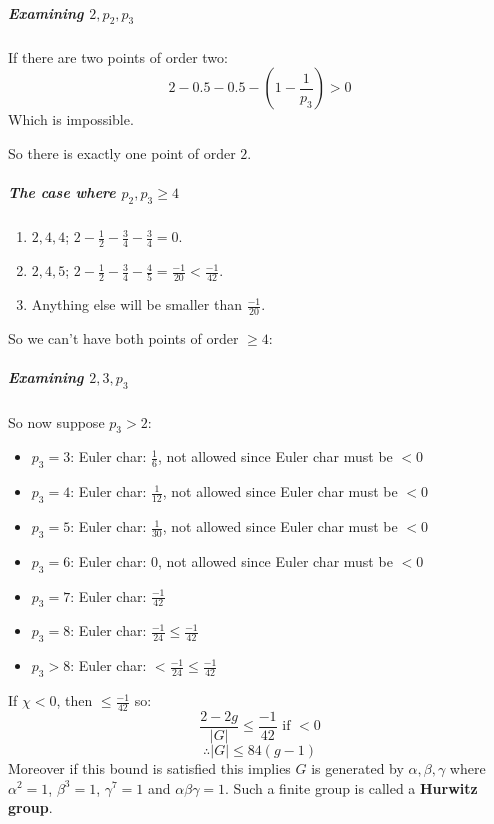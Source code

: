 \subparagraph*{Examining $2,p_2,p_3$}

If there are two points of order two:\[2-0.5-0.5-(1-\frac{1}{p_3}) > 0\]Which is impossible.

So there is exactly one point of order $2$.

\subparagraph*{The case where $p_2,p_3\geq 4$}\begin{enumerate}
    \item $2,4,4$; $2-\frac{1}{2}-\frac{3}{4}-\frac{3}{4} = 0$.
    \item $2,4,5$; $2-\frac{1}{2}-\frac{3}{4}-\frac{4}{5} = \frac{-1}{20}<\frac{-1}{42}$.
    \item Anything else will be smaller than $\frac{-1}{20}$.
\end{enumerate}

So we can't have both points of order $\geq 4$:


\subparagraph*{Examining $2,3,p_3$}
So now suppose $p_3 > 2$:\begin{itemize}
    \item $p_3 = 3$: Euler char: $\frac{1}{6}$, not allowed since Euler char must be $<0$
    \item $p_3 = 4$: Euler char: $\frac{1}{12}$, not allowed since Euler char must be $<0$
    \item $p_3 = 5$: Euler char: $\frac{1}{30}$, not allowed since Euler char must be $<0$
    \item $p_3 = 6$: Euler char: $0$, not allowed since Euler char must be $<0$
    \item $p_3 = 7$: Euler char: $\frac{-1}{42}$
    \item $p_3 = 8$: Euler char: $\frac{-1}{24}\leq \frac{-1}{42}$
    \item $p_3>8$: Euler char: $<\frac{-1}{24}\leq \frac{-1}{42}$
\end{itemize}

If $\chi<0$, then $\leq \frac{-1}{42}$ so:\[\frac{2-2g}{|G|}\leq \frac{-1}{42} \text{ if }<0\]
\[\therefore |G| \leq 84(g-1)\]
Moreover if this bound is satisfied this implies $G$ is generated by $\alpha, \beta,\gamma$ where $\alpha^2 = 1$, $\beta^3 = 1$, $\gamma^7 = 1$ and $\alpha\beta\gamma = 1$. Such a finite group is called a \textbf{Hurwitz group}.

